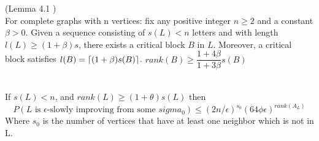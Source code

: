 \begin{lemma}
\label{critical}
(Lemma 4.1 \cite{angel2016local}) \\
For complete graphs with n vertices: fix any positive integer $n \geq 2$ and a constant $\beta > 0$. Given a sequence consisting of $s(L) < n$ letters and with length $l(L) \geq (1 +\beta)s$, there exists a critical block $B$ in $L$. Moreover, a critical block satisfies $l(B) = \lceil(1 + \beta)s(B)\rceil$.
$rank(B) \geq \dfrac{1+4\beta}{1 + 3\beta}s(B)$
\end{lemma} 

\begin{lemma} \leavevmode \\
\label{boundN}
If $s(L) < n$, and $rank(L) \geq (1+\theta)s(L)$ then \\
\begin{equation*}
P(L \text{ is }\epsilon\text{-slowly improving from some }sigma_0)  \leq (2n/\epsilon)^{s_0}(64\phi\epsilon)^{rank(A_L)}
\end{equation*}
Where $s_0$ is the number of vertices that have at least one neighbor which is not in L. 
\end{lemma}

